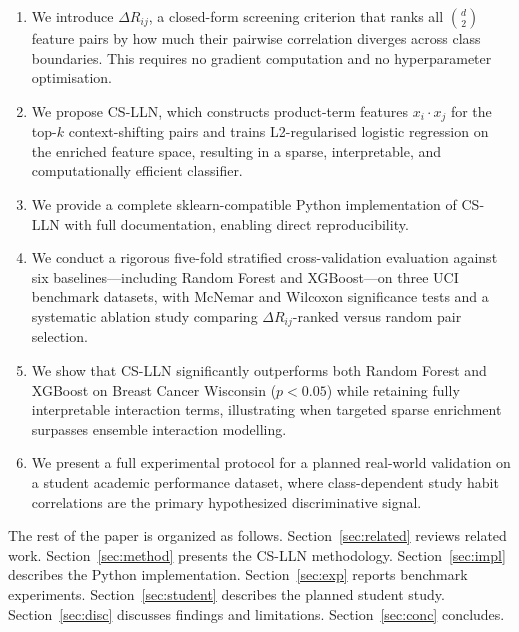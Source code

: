 \documentclass[conference]{IEEEtran}
\begin{document}
\begin{enumerate}

\item We introduce $\Delta R_{ij}$, a closed-form screening criterion that
ranks all $\binom{d}{2}$ feature pairs by how much their pairwise
correlation diverges across class boundaries. This requires no gradient
computation and no hyperparameter optimisation.

\item We propose CS-LLN, which constructs product-term features $x_i
\cdot x_j$ for the top-$k$ context-shifting pairs and trains L2-regularised
logistic regression on the enriched feature space, resulting in a sparse,
interpretable, and computationally efficient classifier.

\item We provide a complete sklearn-compatible Python implementation of
CS-LLN with full documentation, enabling direct reproducibility.

\item We conduct a rigorous five-fold stratified cross-validation evaluation
against six baselines---including Random Forest and XGBoost---on three UCI
benchmark datasets, with McNemar and Wilcoxon significance tests and a
systematic ablation study comparing $\Delta R_{ij}$-ranked versus random
pair selection.

\item We show that CS-LLN significantly outperforms both Random Forest and
XGBoost on Breast Cancer Wisconsin ($p < 0.05$) while retaining fully
interpretable interaction terms, illustrating when targeted sparse enrichment
surpasses ensemble interaction modelling.

\item We present a full experimental protocol for a planned real-world
validation on a student academic performance dataset, where class-dependent
study habit correlations are the primary hypothesized discriminative signal.

\end{enumerate}

The rest of the paper is organized as follows.
Section~\ref{sec:related} reviews related work.
Section~\ref{sec:method} presents the CS-LLN methodology.
Section~\ref{sec:impl} describes the Python implementation.
Section~\ref{sec:exp} reports benchmark experiments.
Section~\ref{sec:student} describes the planned student study.
Section~\ref{sec:disc} discusses findings and limitations.
Section~\ref{sec:conc} concludes.
\end{document}
